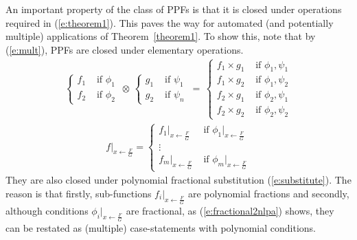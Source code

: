 \documentclass[letterpaper]{article}
\newcommand{\case}[2]{#2 &\text{ if } #1}%
\begin{document}
An important property of the class of PPFs is that it is closed under operations required in (\ref{e:theorem1}). 
This paves the way for automated (and potentially multiple) applications of Theorem~\ref{theorem1}.
To show this, note that by (\ref{e:mult}), PPFs are closed under elementary operations. 
{\footnotesize
\begin{align}\label{e:mult}
\begin{cases}
  \case{\phi_1}{f_1}\\
  \case{\phi_2}{f_2}    
  \end{cases}
\,
 \otimes
\,
  \begin{cases}
  \case{\psi_1}{g_1} \\
  \case{\psi_n}{g_2} 
  \end{cases}
 \, = \,
\begin{cases}
  \case{\phi_1, \psi_1}{f_1 \times g_1} \\ 
  \case{\phi_1, \psi_2}{f_1 \times g_2} \\
  \case{\phi_2, \psi_1}{f_2 \times g_1} \\
  \case{\phi_2, \psi_2}{f_2 \times g_2}
  \end{cases}
\end{align} 
\begin{align}\label{e:substitute}
f|_{x \leftarrow \frac{F}{G}}
=
\begin{cases}
  \case{{\phi_1}|_{x \leftarrow \frac{F}{G}}}{{f_1}|_{x \leftarrow \frac{F}{G}}}\\
\vdots\\
  \case{{\phi_m}|_{x \leftarrow \frac{F}{G}}}{{f_m}|_{x \leftarrow \frac{F}{G}}}    
  \end{cases}
\end{align} 
}
%
They are also closed under polynomial fractional substitution (\ref{e:substitute}). 
The reason is that 
firstly, sub-functions $f_i |_{x \leftarrow \frac{F}{G}}$ are polynomial fractions 
and secondly, although conditions ${\phi_i}|_{x \leftarrow \frac{F}{G}}$ are fractional, as
(\ref{e:fractional2nlpa}) shows, 
they can be restated as (multiple) case-statements with polynomial conditions. 
\end{document}
